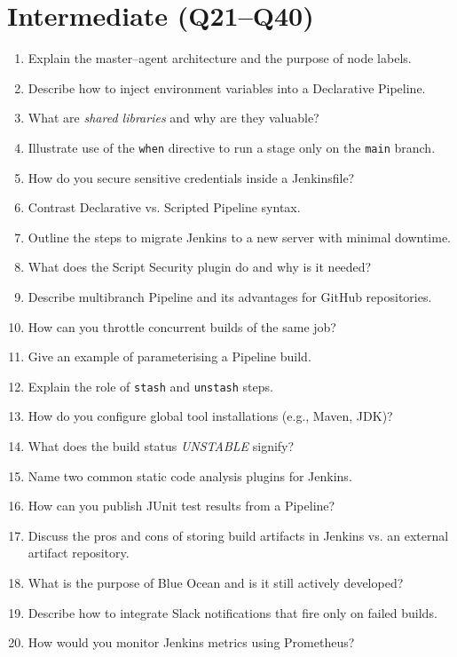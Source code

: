 \documentclass[12pt]{article}
\begin{document}
\section*{Intermediate (Q21--Q40)}
\begin{enumerate}[label=\textbf{\arabic*.},start=21]
  \item Explain the master--agent architecture and the purpose of node labels.
  \item Describe how to inject environment variables into a Declarative Pipeline.
  \item What are \emph{shared libraries} and why are they valuable?
  \item Illustrate use of the \texttt{when} directive to run a stage only on the \texttt{main} branch.
  \item How do you secure sensitive credentials inside a Jenkinsfile?
  \item Contrast Declarative vs. Scripted Pipeline syntax.
  \item Outline the steps to migrate Jenkins to a new server with minimal downtime.
  \item What does the Script Security plugin do and why is it needed?
  \item Describe multibranch Pipeline and its advantages for GitHub repositories.
  \item How can you throttle concurrent builds of the same job?
  \item Give an example of parameterising a Pipeline build.
  \item Explain the role of \texttt{stash} and \texttt{unstash} steps.
  \item How do you configure global tool installations (e.g., Maven, JDK)?
  \item What does the build status \emph{UNSTABLE} signify?
  \item Name two common static code analysis plugins for Jenkins.
  \item How can you publish JUnit test results from a Pipeline?
  \item Discuss the pros and cons of storing build artifacts in Jenkins vs. an external artifact repository.
  \item What is the purpose of Blue Ocean and is it still actively developed?
  \item Describe how to integrate Slack notifications that fire only on failed builds.
  \item How would you monitor Jenkins metrics using Prometheus?
\end{enumerate}
\end{document}
